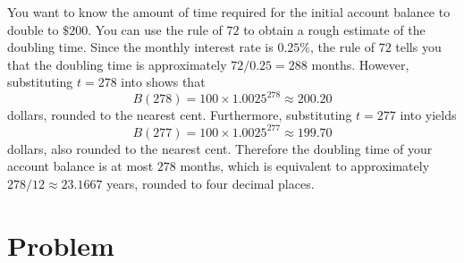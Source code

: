\documentclass[a4paper,oneside,12pt]{article}
\begin{document}
{\begin{solution}
You want to know the amount of time required for the initial account
balance to double to $\$200$.  You can use the rule of $72$ to obtain
a rough estimate of the doubling time.  Since the monthly interest
rate is $0.25\%$, the rule of $72$ tells you that the doubling time is
approximately $72 / 0.25 = 288$ months.  However, substituting
$t = 278$ into  shows that
\[
B(278)
=
100 \times 1.0025^{278}
\approx
200.20
\]
dollars, rounded to the nearest cent.  Furthermore, substituting
$t = 277$ into  yields
\[
B(277)
=
100 \times 1.0025^{277}
\approx
199.70
\]
dollars, also rounded to the nearest cent.  Therefore the doubling
time of your account balance is at most $278$ months, which is
equivalent to approximately $278 / 12 \approx 23.1667$ years, rounded
to four decimal places.
\end{solution}
}{}


\newpage

\section*{Problem}
\end{document}
